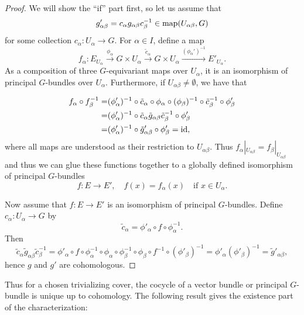 \documentclass[a4paper,openany]{scrbook}
\begin{document}
\begin{proof}
We will show the ``if'' part first, so let us assume that
\[
g'_{\alpha\beta} = c_\alpha g_{\alpha\beta} c_\beta^{-1} \in \operatorname{map}(U_{\alpha\beta},G)
\]
for some collection $c_\alpha\colon U_\alpha \to G$. For $\alpha \in I$, define a map
\[
f_\alpha\colon E_{U_\alpha} \xrightarrow{\phi_\alpha} G \times U_\alpha \xrightarrow{\tilde c_\alpha} G \times U_\alpha \xrightarrow{(\phi_\alpha')^{-1}} E'_{U_\alpha}.
\]
As a composition of three $G$-equivariant maps over $U_\alpha$, it is an isomorphism of principal $G$-bundles over $U_\alpha$. Furthermore, if $U_{\alpha\beta} \neq \emptyset$, we have that

\begin{align*}
f_\alpha \circ f_\beta^{-1} =& (\phi'_\alpha)^{-1} \circ \tilde c_\alpha \circ \phi_{\alpha} \circ (\phi_{\beta})^{-1} \circ \tilde c_\beta^{-1} \circ \phi'_\beta\\
=& (\phi'_\alpha)^{-1} \circ \tilde c_\alpha \tilde g_{\alpha\beta}\tilde c_{\beta}^{-1} \circ \phi'_\beta\\
= & (\phi'_\alpha)^{-1} \circ \tilde g'_{\alpha\beta} \circ \phi'_\beta = \operatorname{id},
\end{align*}
where all maps are understood as their restriction to $U_{\alpha\beta}$. Thus $f_\alpha|_{U_{\alpha\beta}} = f_\beta|_{U_{\alpha\beta}}$ and thus we can glue these functions together to a globally defined isomorphism of principal $G$-bundles
\[
f\colon E \to E', \quad f(x) = f_\alpha(x) \quad \text{if } x \in U_\alpha.
\]

Now assume that $f\colon E \to E'$ is an isomorphism of principal $G$-bundles. Define $c_\alpha\colon U_\alpha \to G$ by 
\[
\tilde c_\alpha = \phi'_\alpha \circ f \circ \phi_\alpha^{-1}.
\]
Then
\[
\tilde c_\alpha \tilde g_{\alpha\beta} \tilde c_\beta^{-1} = \phi'_\alpha \circ f \circ \phi_\alpha^{-1} \circ \phi_\alpha \circ \phi_\beta^{-1} \circ \phi_\beta \circ f^{-1} \circ (\phi'_\beta)^{-1} =  \phi'_\alpha (\phi'_{\beta})^{-1} = \tilde g'_{\alpha\beta},
\]
hence $g$ and $g'$ are cohomologous.
\end{proof}

Thus for a chosen trivializing cover, the cocycle of a vector bundle or principal $G$-bundle is unique up to cohomology. The following result gives the existence part of the characterization:
\end{document}
